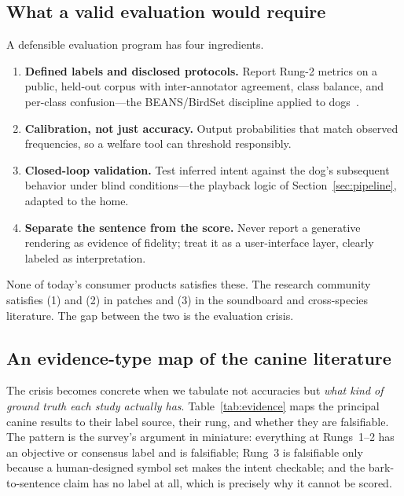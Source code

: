 \subsection{What a valid evaluation would require}
A defensible evaluation program has four ingredients.
\begin{enumerate}[label=(\arabic*)]
  \item \textbf{Defined labels and disclosed protocols.} Report Rung-2
  metrics on a public, held-out corpus with inter-annotator agreement, class
  balance, and per-class confusion---the BEANS/BirdSet discipline applied to
  dogs~\cite{hagiwara2023beans}.
  \item \textbf{Calibration, not just accuracy.} Output probabilities that
  match observed frequencies, so a welfare tool can threshold responsibly.
  \item \textbf{Closed-loop validation.} Test inferred intent against the
  dog's subsequent behavior under blind conditions---the playback logic of
  Section~\ref{sec:pipeline}, adapted to the home.
  \item \textbf{Separate the sentence from the score.} Never report a
  generative rendering as evidence of fidelity; treat it as a user-interface
  layer, clearly labeled as interpretation.
\end{enumerate}
None of today's consumer products satisfies these. The research community
satisfies (1) and (2) in patches and (3) in the soundboard and cross-species
literature. The gap between the two is the evaluation crisis.

\subsection{An evidence-type map of the canine literature}
The crisis becomes concrete when we tabulate not accuracies but \emph{what
kind of ground truth each study actually has}. Table~\ref{tab:evidence} maps
the principal canine results to their label source, their rung, and whether
they are falsifiable. The pattern is the survey's argument in miniature:
everything at Rungs~1--2 has an objective or consensus label and is
falsifiable; Rung~3 is falsifiable only because a human-designed symbol set
makes the intent checkable; and the bark-to-sentence claim has no label at
all, which is precisely why it cannot be scored.

